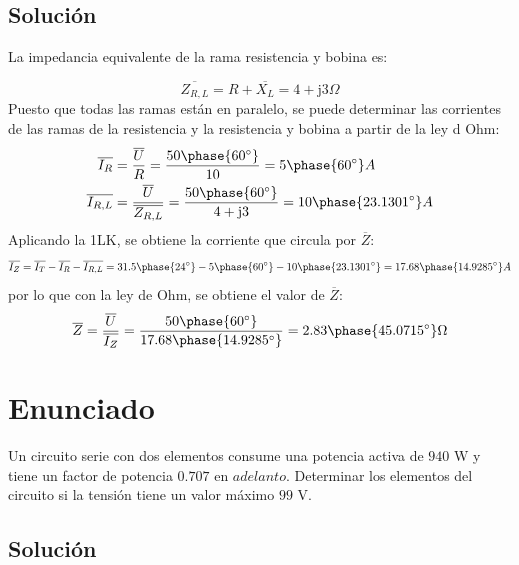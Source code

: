 \subsection*{Solución}

La impedancia equivalente de la rama resistencia y bobina es:

\begin{equation*}
  \overline{Z_{R,L}}=R+\overline{X_L}=4+\mathrm{j}3\Omega
\end{equation*}
Puesto que todas las ramas están en paralelo, se puede determinar las
corrientes de las ramas de la resistencia y la resistencia y bobina a
partir de la ley d Ohm:
\begin{align*}
  \overline{I_R}&=\dfrac{\overline{U}}{R}=\dfrac{50\phase{60^\circ}}{10}=5\phase{60^\circ} A\\
  \overline{I_{R,L}}&=\dfrac{\overline{U}}{\overline{Z_{R,L}}}=\dfrac{50\phase{60^\circ}}{4+\mathrm{j}3}=10\phase{23.1301^\circ} A
\end{align*}
Aplicando la 1LK, se obtiene la corriente que circula por
$\overline{Z}$:
\begin{equation*}
  \overline{I_Z}=\overline{I_T}-\overline{I_R}-\overline{I_{R,L}}=31.5\phase{24^\circ}-5\phase{60^\circ}-10\phase{23.1301^\circ}=17.68\phase{14.9285^\circ} A
\end{equation*}
por lo que con la ley de Ohm, se obtiene el valor de $\overline{Z}$:
\begin{equation*}
  \overline{Z}=\dfrac{\overline{U}}{\overline{I_Z}}=\dfrac{50\phase{60^\circ}}{17.68\phase{14.9285^\circ}}=2.83\phase{45.0715^\circ}\Omega
\end{equation*}



\section{Enunciado}

Un circuito serie con dos elementos consume una potencia activa de
$940$ W y tiene un factor de potencia $0.707$ en
$adelanto$. Determinar los elementos del circuito si la tensión tiene
un valor máximo $99$ V.

\subsection*{Solución}

